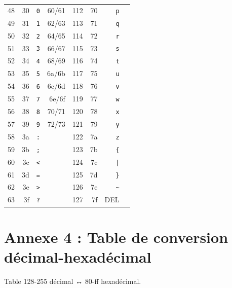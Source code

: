 {\begin{longtable}[]{@{}rrrrrrrr@{}}
48 & 30 & \texttt{0} & 60/61 & 112 & 70 & \texttt{p} &  \\
49 & 31 & \texttt{1} & 62/63 & 113 & 71 & \texttt{q} &  \\
50 & 32 & \texttt{2} & 64/65 & 114 & 72 & \texttt{r} &  \\
51 & 33 & \texttt{3} & 66/67 & 115 & 73 & \texttt{s} &  \\
52 & 34 & \texttt{4} & 68/69 & 116 & 74 & \texttt{t} &  \\
53 & 35 & \texttt{5} & 6a/6b & 117 & 75 & \texttt{u} &  \\
54 & 36 & \texttt{6} & 6c/6d & 118 & 76 & \texttt{v} &  \\
55 & 37 & \texttt{7} & 6e/6f & 119 & 77 & \texttt{w} &  \\
56 & 38 & \texttt{8} & 70/71 & 120 & 78 & \texttt{x} &  \\
57 & 39 & \texttt{9} & 72/73 & 121 & 79 & \texttt{y} &  \\
58 & 3a & \texttt{:} &  & 122 & 7a & \texttt{z} &  \\
59 & 3b & \texttt{;} &  & 123 & 7b & \texttt{\{} &  \\
60 & 3c & \texttt{<} &  & 124 & 7c & \texttt{|} &  \\
61 & 3d & \texttt{=} &  & 125 & 7d & \texttt{\}} &  \\
62 & 3e & \texttt{>} &  & 126 & 7e & \texttt{\textasciitilde{}} &  \\
63 & 3f & \texttt{?} &  & 127 & 7f & DEL &  \\
\end{longtable}
}

\clearpage
\section*{Annexe 4 : Table de conversion
décimal-hexadécimal}\label{annexe-4-table-de-conversion-duxe9cimal-hexaduxe9cimal}

{\small
Table 128-255 décimal ↔ 80-ff hexadécimal.
}

